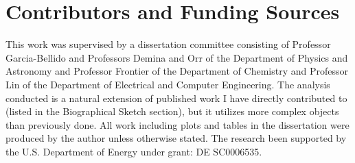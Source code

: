 \section*{Contributors and Funding Sources}

This work was supervised by a dissertation committee consisting of Professor 
Garcia-Bellido and Professors Demina and Orr of the Department of Physics and
Astronomy and Professor Frontier of the Department of Chemistry and Professor 
Lin of the Department of Electrical and Computer Engineering. The analysis conducted 
is a natural extension of published work I have directly contributed to (listed in 
the Biographical Sketch section), but it utilizes more complex objects than previously done.
All work including plots and tables in the dissertation were produced by the author 
unless otherwise stated. The research been supported by the U.S. Department of Energy under
grant: DE SC0006535.
